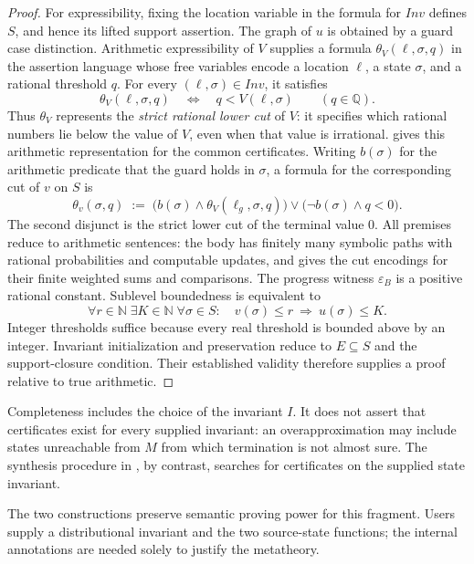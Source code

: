 \begin{proof}
For expressibility, fixing the location variable in the formula for
$\mathit{Inv}$ defines $S$, and hence its lifted support assertion.
The graph of $u$ is obtained by a guard case distinction.
Arithmetic expressibility of $V$ supplies a formula
$\theta_V(\ell,\sigma,q)$ in the assertion language whose free
variables encode a location $\ell$, a state $\sigma$, and a rational
threshold $q$. For every $(\ell,\sigma)\in\mathit{Inv}$, it satisfies
\[
 \theta_V(\ell,\sigma,q)\quad\Longleftrightarrow\quad
 q<V(\ell,\sigma)\qquad(q\in\mathbb Q).
\]
Thus $\theta_V$ represents the \emph{strict rational lower cut} of $V$:
it specifies which rational numbers lie below the value of $V$, even
when that value is irrational.  gives this
arithmetic representation for the common certificates.
Writing $b(\sigma)$ for the arithmetic predicate that the guard holds
in $\sigma$, a formula for the corresponding cut of $v$ on $S$ is
\[
 \theta_v(\sigma,q)\;:=\;
 \bigl(b(\sigma)\land\theta_V(\ell_g,\sigma,q)\bigr)
 \lor\bigl(\neg b(\sigma)\land q<0\bigr).
\]
The second disjunct is the strict lower cut of the terminal value $0$.
All premises reduce to arithmetic sentences: the body has finitely many
symbolic paths with rational probabilities and computable updates, and
 gives the cut encodings for their
finite weighted sums and comparisons. The progress witness
$\varepsilon_B$ is a positive rational constant. Sublevel boundedness is
equivalent to
\[
 \forall r\in\mathbb N\;\exists K\in\mathbb N\;\forall\sigma\in S:
 \quad v(\sigma)\leq r\ \Longrightarrow\ u(\sigma)\leq K.
\]
Integer thresholds suffice because every real threshold is bounded above
by an integer. Invariant initialization and preservation reduce
to $E\subseteq S$ and the support-closure condition. Their established
validity therefore supplies a proof relative to true arithmetic.
\end{proof}

Completeness includes the choice of the invariant $I$. It does not
assert that certificates exist for every supplied invariant: an
overapproximation may include states unreachable from $M$ from which
termination is not almost sure. The synthesis procedure in
,
by contrast, searches for certificates on the supplied state invariant.

The two constructions preserve semantic proving power for this fragment.
Users supply a distributional invariant and the two source-state
functions; the internal annotations are needed solely to justify the
metatheory.
